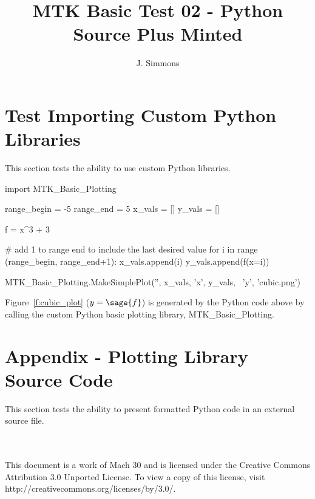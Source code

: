 \documentclass{article}
\title{MTK Basic Test 02 - Python Source Plus Minted}
\author{J. Simmons}
\begin{document}
\maketitle

\section{Test Importing Custom Python Libraries}
This section tests the ability to use custom Python libraries.

\begin{sageblock}
  import MTK_Basic_Plotting
  
  range_begin = -5
  range_end = 5 
  x_vals = []
  y_vals = []
  
  f = x^3 + 3
  
  # add 1 to range end to include the last desired value
  for i in range (range_begin, range_end+1):
    x_vals.append(i)
    y_vals.append(f(x=i))
    
  MTK_Basic_Plotting.MakeSimplePlot('', x_vals, 'x', y_vals, \ 
                                    'y', 'cubic.png')  
  
\end{sageblock}

Figure~\ref{f:cubic_plot} ($y = \sage{f}$) is generated by the Python code above by calling the custom Python basic plotting library, MTK\_Basic\_Plotting.

\clearpage


\section*{Appendix - Plotting Library Source Code}
This section tests the ability to present formatted Python code in an external source file.

\inputminted[linenos,frame=lines,framesep=2.0\fboxsep]{python}{MTK_Basic_Plotting.py}

\section*{}
This document is a work of Mach 30 and is licensed under the Creative Commons Attribution 3.0 Unported License. To view a copy of this license, visit http://creativecommons.org/licenses/by/3.0/.
\end{document}

